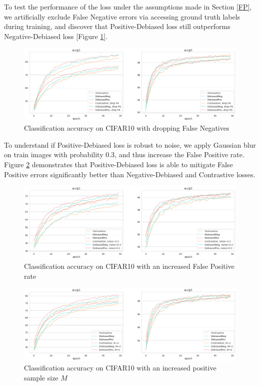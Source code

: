 \documentclass{article}
\begin{document}
To test the performance of the loss under the assumptions made in Section \ref{FP}, we artificially exclude False Negative errors via accessing ground truth labels during training, and discover that Positive-Debiased loss still outperforms Negative-Debiased loss [Figure \ref{fig:fig3}].

\begin{figure}
\includegraphics[width=1\textwidth]{figures/base_vs_dropfn.png}
\caption{Classification accuracy on CIFAR10 with dropping False Negatives}
\label{fig:fig3}
\end{figure}

To understand if Positive-Debiased loss is robust to noise, we apply Gaussian blur on train images with probability 0.3, and thus increase the False Positive rate. Figure \ref{fig:fig4} demonstrates that Positive-Debiased loss is able to mitigate False Positive errors significantly better than Negative-Debiased and Contrastive losses.

\begin{figure}
\includegraphics[width=1\textwidth]{figures/base_vs_noise.png}
\caption{Classification accuracy on CIFAR10 with an increased False Positive rate}
\label{fig:fig4}
\end{figure}

\begin{figure}
\includegraphics[width=1\textwidth]{figures/base_vs_M=2.png}
\caption{Classification accuracy on CIFAR10 with an increased positive sample size $M$}
\label{fig:fig5}
\end{figure}
\end{document}
